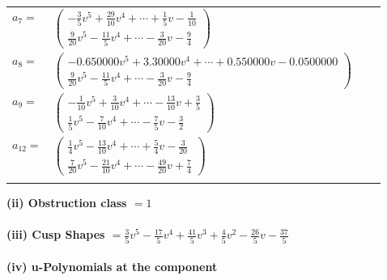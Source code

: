 \documentclass[1p]{elsarticle_modified}
\theoremstyle{definition}
\begin{document}
\begin{tabular}{m{7pt} m{180pt} m{7pt} m{180pt} }
\flushright $a_{7}=$&$\begin{pmatrix}-\frac{3}{5} v^5+\frac{29}{10} v^4+\cdots+\frac{1}{5} v-\frac{1}{10}\\\frac{9}{20} v^5-\frac{11}{5} v^4+\cdots-\frac{3}{20} v-\frac{9}{4}\end{pmatrix}$ \\
\flushright $a_{8}=$&$\begin{pmatrix}-0.650000 v^{5}+3.30000 v^{4}+\cdots+0.550000 v-0.0500000\\\frac{9}{20} v^5-\frac{11}{5} v^4+\cdots-\frac{3}{20} v-\frac{9}{4}\end{pmatrix}$ \\
\flushright $a_{9}=$&$\begin{pmatrix}-\frac{1}{10} v^5+\frac{3}{10} v^4+\cdots-\frac{13}{10} v+\frac{3}{5}\\\frac{1}{5} v^5-\frac{7}{10} v^4+\cdots-\frac{7}{5} v-\frac{3}{2}\end{pmatrix}$ \\
\flushright $a_{12}=$&$\begin{pmatrix}\frac{1}{4} v^5-\frac{13}{10} v^4+\cdots+\frac{5}{4} v-\frac{3}{20}\\\frac{7}{20} v^5-\frac{21}{10} v^4+\cdots-\frac{49}{20} v+\frac{7}{4}\end{pmatrix}$\\&\end{tabular}
\flushleft \textbf{(ii) Obstruction class $= 1$}\\~\\
\flushleft \textbf{(iii) Cusp Shapes $= \frac{3}{5} v^5-\frac{17}{5} v^4+\frac{41}{5} v^3+\frac{4}{5} v^2-\frac{26}{5} v-\frac{37}{5}$}\\~\\
\newpage\renewcommand{\arraystretch}{1}
\flushleft \textbf{(iv) u-Polynomials at the component}\newline \\
\end{document}
